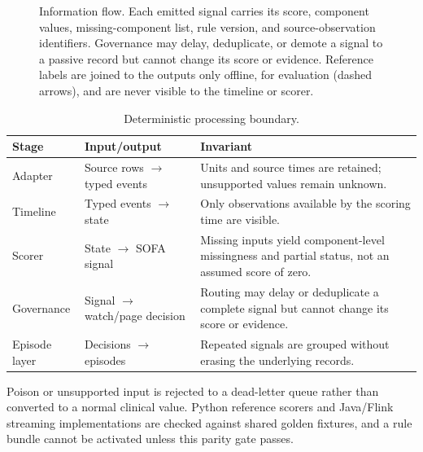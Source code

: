 \documentclass[journal]{IEEEtran}
\begin{document}
\begin{figure}[t]
\caption{Information flow. Each emitted signal carries its score, component
values, missing-component list, rule version, and source-observation
identifiers. Governance may delay, deduplicate, or demote a signal to a
passive record but cannot change its score or evidence. Reference labels are
joined to the outputs only offline, for evaluation (dashed arrows), and are
never visible to the timeline or scorer.}
\label{fig:system}
\end{figure}

\begin{table}[t]
\centering
\caption{Deterministic processing boundary.}
\label{tab:boundary}
\footnotesize
\begin{tabular}{@{}p{}p{}p{}@{}}
\toprule
Stage & Input/output & Invariant \\
\midrule
Adapter & Source rows $\rightarrow$ typed events & Units and source times are retained; unsupported values remain unknown. \\
Timeline & Typed events $\rightarrow$ state & Only observations available by the scoring time are visible. \\
Scorer & State $\rightarrow$ SOFA signal & Missing inputs yield component-level missingness and partial status, not an assumed score of zero. \\
Governance & Signal $\rightarrow$ watch/page decision & Routing may delay or deduplicate a complete signal but cannot change its score or evidence. \\
Episode layer & Decisions $\rightarrow$ episodes & Repeated signals are grouped without erasing the underlying records. \\
\bottomrule
\end{tabular}
\end{table}

Poison or unsupported input is rejected to a dead-letter queue rather than
converted to a normal clinical value. Python reference scorers and Java/Flink
streaming implementations are checked against shared golden fixtures, and a
rule bundle cannot be activated unless this parity gate passes.
\end{document}
